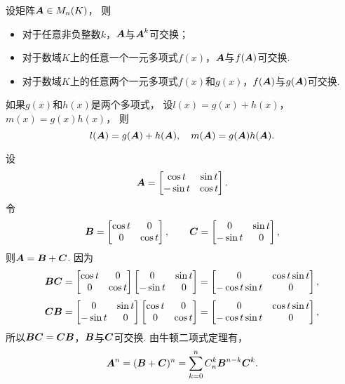 \begin{theorem}
设矩阵\(\boldsymbol{A} \in M_n(K)\)，
则\begin{itemize}
	\item 对于任意非负整数\(k\)，\(\boldsymbol{A}\)与\(\boldsymbol{A}^k\)可交换；
	\item 对于数域\(K\)上的任意一个一元多项式\(f(x)\)，\(\boldsymbol{A}\)与\(f(\boldsymbol{A})\)可交换.
	\item 对于数域\(K\)上的任意两个一元多项式\(f(x)\)和\(g(x)\)，\(f(\boldsymbol{A})\)与\(g(\boldsymbol{A})\)可交换.
\end{itemize}
\end{theorem}

\begin{theorem}
如果\(g(x)\)和\(h(x)\)是两个多项式，
设\(l(x) = g(x) + h(x)\)，\(m(x) = g(x) h(x)\)，
则\[
	l(\boldsymbol{A}) = g(\boldsymbol{A}) + h(\boldsymbol{A}),
	\quad
	m(\boldsymbol{A}) = g(\boldsymbol{A}) h(\boldsymbol{A}).
\]
\end{theorem}

\begin{example}
设\[
	\boldsymbol{A} = \begin{bmatrix}
	\cos t & \sin t \\
	-\sin t & \cos t
	\end{bmatrix}.
\]
令\[
	\boldsymbol{B} = \begin{bmatrix}
		\cos t & 0 \\
		0 & \cos t
	\end{bmatrix},
	\qquad
	\boldsymbol{C} = \begin{bmatrix}
		0 & \sin t \\
		-\sin t & 0
	\end{bmatrix},
\]
则\(\boldsymbol{A}=\boldsymbol{B}+\boldsymbol{C}\).
因为\[
	\boldsymbol{B}\boldsymbol{C} = \begin{bmatrix}
		\cos t & 0 \\
		0 & \cos t
	\end{bmatrix}
	\begin{bmatrix}
		0 & \sin t \\
		-\sin t & 0
	\end{bmatrix}
	= \begin{bmatrix}
		0 & \cos t \sin t \\
		-\cos t \sin t & 0
	\end{bmatrix},
\]\[
	\boldsymbol{C}\boldsymbol{B} = \begin{bmatrix}
		0 & \sin t \\
		-\sin t & 0
	\end{bmatrix}
	\begin{bmatrix}
		\cos t & 0 \\
		0 & \cos t
	\end{bmatrix}
	= \begin{bmatrix}
		0 & \cos t \sin t \\
		-\cos t \sin t & 0
	\end{bmatrix},
\]
所以\(\boldsymbol{B}\boldsymbol{C}=\boldsymbol{C}\boldsymbol{B}\)，\(\boldsymbol{B}\)与\(\boldsymbol{C}\)可交换.
由牛顿二项式定理有，\[
	\boldsymbol{A}^n=(\boldsymbol{B}+\boldsymbol{C})^n
	=\sum_{k=0}^n C_n^k \boldsymbol{B}^{n-k} \boldsymbol{C}^k.
\]
\end{example}

